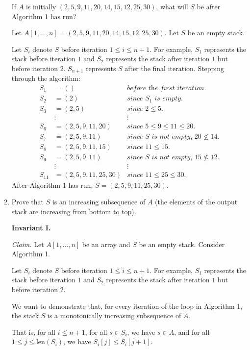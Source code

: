 \begin{enumerate}
    If $A$ is initially $(2,5,9,11,20,14,15,12,25,30)$, what will $S$ be after Algorithm 1 has run?
\begin{solution}
Let $A[1,\dots,n]=(2,5,9,11,20,14,15,12,25,30)$. Let $S$ be an empty stack. 

Let $S_i$ denote $S$ before iteration $1\leq i\leq n+1$. For example, $S_1$ represents the stack before iteration $1$ and $S_2$ represents the stack after iteration $1$ but before iteration $2$. $S_{n+1}$ represents $S$ after the final iteration. Stepping through the algorithm:
\begin{align*}
S_1&=()&\textit{before the first iteration.}\\
S_2&=(2)&\textit{since $S_1$ is empty.}\\
S_3&=(2,5)&\textit{since $2\leq 5$.}\\
~&\vdots&\vdots\\
S_6&=(2,5,9,11,20)&\textit{since $5\leq 9\leq 11\leq 20$.}\\
S_7&=(2,5,9,11)&\textit{since $S$ is not empty, $20\nleq 14$.}\\
S_8&=(2,5,9,11,15)&\textit{since $11\leq 15$.}\\
S_9&=(2,5,9,11)&\textit{since $S$ is not empty, $15\nleq 12$.}\\
~&\vdots&\vdots\\
S_{11}&=(2,5,9,11,25,30)&\textit{since $11\leq 25\leq 30$.}
\end{align*}
After Algorithm 1 has run, $S=(2,5,9,11,25,30)$.
\end{solution}
\newpage\item Prove that $S$ is an increasing subsequence of $A$ (the elements of the output stack are increasing from bottom to top).
\begin{solution}\textbf{Invariant I.}

\textit{Claim. }Let $A[1,\dots,n]$ be an array and $S$ be an empty stack. Consider Algorithm 1.

Let $S_i$ denote $S$ before iteration $1\leq i\leq n+1$. For example, $S_1$ represents the stack before iteration $1$ and $S_2$ represents the stack after iteration $1$ but before iteration $2$. 

We want to demonstrate that, for every iteration of the loop in Algorithm 1, the stack $S$ is a monotonically increasing subsequence of $A$.

That is, for all $i\leq n+1$, for all $s\in S_i$, we have $s\in A$, and for all $1\leq j\leq\text{len}(S_i)$, we have $S_i[j]\leq S_i[j+1]$.


\end{solution}
\end{enumerate}
